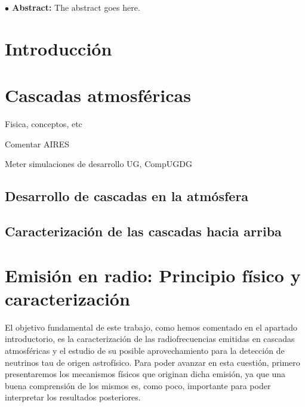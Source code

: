 \documentclass[12 pt, a4paper]{article} %
\numberwithin{equation}{section}
\numberwithin{figure}{section}
\begin{document}
	
	\begin{flushleft}  {\bf $\bullet$ Abstract:\;\;}
		The abstract goes here.
	\end{flushleft}\mbox{}
	
	\clearpage
	\pagestyle{fancy}
	\lhead{}
	\chead{}
	\rhead{}
	\renewcommand{\headrulewidth}{0.1pt}
	\lfoot{} 
	\cfoot{\thepage}
	\rfoot{} 
	\renewcommand{\footrulewidth}{0pt}
	
	\setcounter{page}{1}
	\tableofcontents
	\clearpage
	
	\section{Introducción}\label{sec1}
	\clearpage
	\section{Cascadas atmosféricas}\label{sec2}
	Fisica, conceptos, etc
	
	Comentar AIRES
	
	Meter simulaciones de desarrollo UG, CompUGDG
	\subsection{Desarrollo de cascadas en la atmósfera}\label{sec21}
	\subsection{Caracterización de las cascadas hacia arriba}\label{sec22}
	\clearpage %
	\section{Emisión en radio: Principio físico y caracterización}\label{sec3}
	El objetivo fundamental de este trabajo, como hemos comentado en el apartado introductorio, es la caracterización de las radiofrecuencias emitidas en cascadas atmosféricas y el estudio de su posible aprovechamiento para la detección de neutrinos tau de origen astrofísico. Para poder avanzar en esta cuestión, primero presentaremos los mecanismos físicos que originan dicha emisión, ya que una buena comprensión de los mismos es, como poco, importante para poder interpretar los resultados posteriores.
\end{document}
